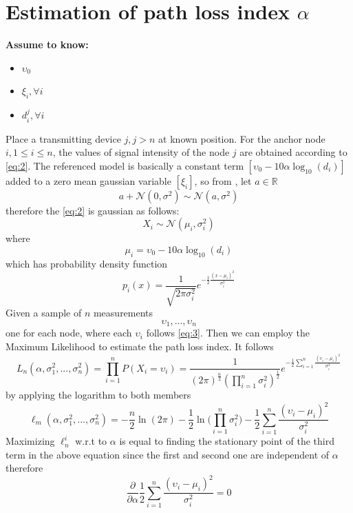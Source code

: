 \documentclass[12pt]{report}
\begin{document}
\section{Estimation of path loss index $\alpha$}
  \begin{center}
  \textbf{Assume to know:}
  \begin{itemize}
    \centering
    \item $\upsilon_0$
    \item $\xi_i,\forall i$
    \item $d_i^j,\forall i$
  \end{itemize}
  \end{center}
  Place a transmitting device $j,j>n$ at known position. For the anchor node $i,1\leq i\leq n$, the values of signal intensity of the node $j$ are obtained according to \ref{eq:2}. The referenced model is basically a constant term $[\upsilon_0-10\alpha\log_{10}(d_i)]$ added to a zero mean gaussian variable $[\xi_i]$, so from \cite{alma9926534668905776}, let $a \in \mathbb{R}$
\begin{equation}
a+\mathcal{N}(0,\sigma^2)\sim\mathcal{N}(a,\sigma^2)
\end{equation} therefore the \ref{eq:2} is gaussian as follows:
\begin{equation}
    X_i\sim \mathcal{N}(\mu_i,\sigma^2_i)
    \label{eq:3}
\end{equation}
where 
\begin{equation}
    \mu_i = \upsilon_0-10\alpha\log_{10}(d_i)
\end{equation}
which has probability density function
\begin{equation}
    p_i(x)=\frac{1}{\sqrt{2\pi\sigma_i^2}}e^{-\frac{1}{2}\frac{(x-\mu_i)^2}{\sigma^2_i}}
\end{equation} 
Given a sample of $n$ measurements $$\upsilon_1,...,\upsilon_n$$ one for each node, where each $\upsilon_i$ follows \ref{eq:3}. Then we can employ the Maximum Likelihood to estimate the path loss index. It follows
\begin{equation}
    L_n(\alpha,\sigma_1^2,...,\sigma_n^2)=\prod_{i=1}^nP(X_i=\upsilon_i)=
    \frac{1}{(2\pi)^{\frac{n}{2}}(\prod_{i=1}^n\sigma_i^2)^\frac{1}{2}}e^{-\frac{1}{2}\sum_{i=1}^n\frac{(\upsilon_i-\mu_i)^2}{\sigma^2_i}}
\end{equation}
by applying the logarithm to both members
\begin{equation}
    \ell_m(\alpha,\sigma_1^2,...,\sigma_n^2)=-\frac{n}{2}\ln(2\pi)-\frac{1}{2}\ln\bigg(\prod_{i=1}^n\sigma^2_i\bigg)-\frac{1}{2}\sum_{i=1}^n\frac{(\upsilon_i-\mu_i)^2}{\sigma^2_i}
\end{equation}
Maximizing $\ell_n^i$ w.r.t to $\alpha$ is equal to finding the stationary point of the third term in the above equation since the first and second one are independent of $\alpha$ therefore \cite{MUNOZ200923} 
\begin{equation}
\frac{\partial}{\partial \alpha} \frac{1}{2}\sum_{i=1}^n\frac{(\upsilon_i-\mu_i)^2}{\sigma^2_i} =0
\end{equation}
\end{document}
